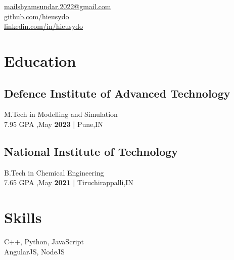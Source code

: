 \documentclass[]{hieudo-build}
\begin{document}
%
%
{
	\faEnvelope \href{mailto:mailshyamsundar.2022@gmail.com}{mailshyamsundar.2022@gmail.com}\\
	\faGithub \href{https://github.com/hieusydo}{   github.com/hieusydo}\\
	\faLinkedinSquare \href{https://www.linkedin.com/in/hieusydo}{   linkedin.com/in/hieusydo}
}
    
%
%
\begin{minipage}[t]{0.34\textwidth} 

\section{Education} 

\subsection{Defence Institute of Advanced Technology}
M.Tech in Modelling and Simulation\\
7.95 GPA ,May \textbf{2023 } | Pune,IN\\
\sectionsep

\subsection{National Institute of Technology}
B.Tech in Chemical Engineering\\
7.65 GPA ,May \textbf{2021 } | Tiruchirappalli,IN\\
\sectionsep


\section{Skills}
C++, Python, JavaScript\\ 

AngularJS, NodeJS \\


\end{minipage}
\end{document}
